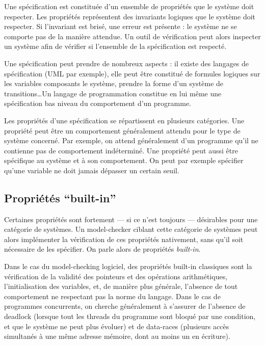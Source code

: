 Une spécification est constituée d'un ensemble de propriétés que le système doit
respecter. Les propriétés représentent des invariants logiques que le système
doit respecter. Si l'invariant est brisé, une erreur est présente : le système ne
se comporte pas de la manière attendue. Un outil de vérification peut alors inspecter
un système afin de vérifier si l'ensemble de la spécification est respecté.

Une spécification peut prendre de nombreux aspects : il existe des langages de
spécification (UML par exemple), elle peut être constitué de formules logiques
sur les variables composants le système, prendre la forme d'un système de
transitions\dots Un langage de programmation constitue en lui même une
spécification bas niveau du comportement d'un programme.

Les propriétés d'une spécification se répartissent en plusieurs catégories. Une
propriété peut être un comportement généralement attendu pour le type de système
concerné. Par exemple, on attend généralement d'un programme qu'il ne contienne
pas de comportement indéterminé. Une propriété peut aussi être spécifique au
système et à son comportement. On peut par exemple spécifier qu'une variable ne
doit jamais dépasser un certain seuil.

\subsection{\texorpdfstring{Propriétés ``built-in''}{Propriétés built-in}}

Certaines propriétés sont fortement --- si ce n'est toujours --- désirables
pour une catégorie de systèmes. Un model-checker ciblant cette catégorie
de systèmes peut alors implémenter la vérification de ces propriétés
nativement, sans qu'il soit nécessaire de les spécifier. On parle alors
de propriétés \emph{built-in}.

Dans le cas du model-checking logiciel, des propriétés built-in
classiques sont la vérification de la validité des pointeurs et des
opérations arithmétiques, l'initialisation des variables, et, de manière
plus générale, l'absence de tout comportement ne respectant pas la norme
du langage.
Dans le cas de programmes concurrents, on cherche généralement à s'assurer de
l'absence de deadlock (lorsque tout les threads du programme sont bloqué par une
condition, et que le système ne peut plus évoluer) et de data-races (plusieurs
accès simultanés à une même adresse mémoire, dont au moins un en écriture).

